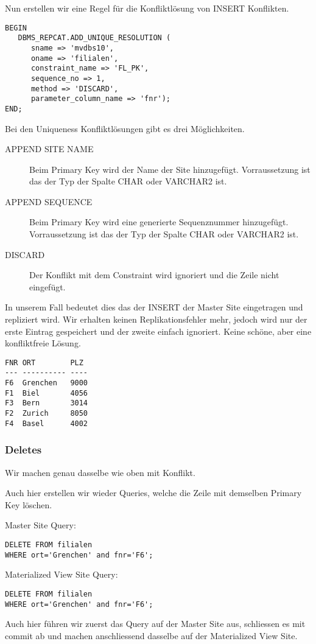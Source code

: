 \documentclass[11pt,a4paper,parskip=half]{scrartcl}
\begin{document}
Nun erstellen wir eine Regel für die Konfliktlösung von INSERT Konflikten.
\begin{lstlisting}
BEGIN
   DBMS_REPCAT.ADD_UNIQUE_RESOLUTION (
      sname => 'mvdbs10',
      oname => 'filialen',
      constraint_name => 'FL_PK',
      sequence_no => 1,
      method => 'DISCARD',
      parameter_column_name => 'fnr');
END;
\end{lstlisting}
Bei den Uniqueness Konfliktlösungen gibt es drei Möglichkeiten.
\begin{description}
	\item[APPEND SITE NAME] Beim Primary Key wird der Name der Site hinzugefügt. Vorraussetzung ist das der Typ der Spalte CHAR oder VARCHAR2 ist.
	\item[APPEND SEQUENCE] Beim Primary Key wird eine generierte Sequenznummer hinzugefügt.  Vorraussetzung ist das der Typ der Spalte CHAR oder VARCHAR2 ist.
	\item[DISCARD] Der Konflikt mit dem Constraint wird ignoriert und die Zeile nicht eingefügt. 
\end{description}
In unserem Fall bedeutet dies das der INSERT der Master Site eingetragen und repliziert wird. Wir erhalten keinen Replikationsfehler mehr, jedoch wird nur der erste Eintrag gespeichert und der zweite einfach ignoriert. Keine schöne, aber eine konfliktfreie Lösung.
\begin{lstlisting}
FNR ORT        PLZ
--- ---------- ----
F6  Grenchen   9000 
F1  Biel       4056 
F3  Bern       3014 
F2  Zurich     8050 
F4  Basel      4002 
\end{lstlisting}

\subsubsection{Deletes}
Wir machen genau dasselbe wie oben mit Konflikt.

Auch hier erstellen wir wieder Queries, welche die Zeile mit demselben Primary Key löschen.

Master Site Query:
\begin{lstlisting}
DELETE FROM filialen
WHERE ort='Grenchen' and fnr='F6'; 
\end{lstlisting}

Materialized View Site Query:
\begin{lstlisting}
DELETE FROM filialen
WHERE ort='Grenchen' and fnr='F6'; 
\end{lstlisting}

Auch hier führen wir zuerst das Query auf der Master Site aus, schliessen es mit commit ab und machen anschliessend dasselbe auf der Materialized View Site.
\end{document}
